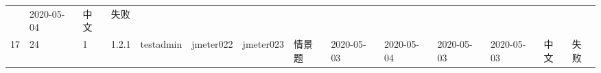 \documentclass[hyperref, a4paper]{ctexart}
\begin{document}
\begin{longtable}[]{@{}llllllllllllll@{}}
\begin{minipage}[t]{0.07\columnwidth}
\end{minipage} & \begin{minipage}[t]{0.08\columnwidth}\raggedright
2020-05-04\strut
\end{minipage} & \begin{minipage}[t]{0.04\columnwidth}\raggedright
中文\strut
\end{minipage} & \begin{minipage}[t]{0.02\columnwidth}\raggedright
失败\strut
\end{minipage}\tabularnewline
\begin{minipage}[t]{0.01\columnwidth}\raggedright
17\strut
\end{minipage} & \begin{minipage}[t]{0.12\columnwidth}\raggedright
24\strut
\end{minipage} & \begin{minipage}[t]{0.03\columnwidth}\raggedright
1\strut
\end{minipage} & \begin{minipage}[t]{0.06\columnwidth}\raggedright
1.2.1\strut
\end{minipage} & \begin{minipage}[t]{0.04\columnwidth}\raggedright
testadmin\strut
\end{minipage} & \begin{minipage}[t]{0.04\columnwidth}\raggedright
jmeter022\strut
\end{minipage} & \begin{minipage}[t]{0.04\columnwidth}\raggedright
jmeter023\strut
\end{minipage} & \begin{minipage}[t]{0.02\columnwidth}\raggedright
情景题\strut
\end{minipage} & \begin{minipage}[t]{0.04\columnwidth}\raggedright
2020-05-03\strut
\end{minipage} & \begin{minipage}[t]{0.05\columnwidth}\raggedright
2020-05-04\strut
\end{minipage} & \begin{minipage}[t]{0.07\columnwidth}\raggedright
2020-05-03\strut
\end{minipage} & \begin{minipage}[t]{0.08\columnwidth}\raggedright
2020-05-03\strut
\end{minipage} & \begin{minipage}[t]{0.04\columnwidth}\raggedright
中文\strut
\end{minipage} & \begin{minipage}[t]{0.02\columnwidth}\raggedright
失败\strut
\end{minipage}\tabularnewline
\bottomrule
\end{longtable}
\end{document}
